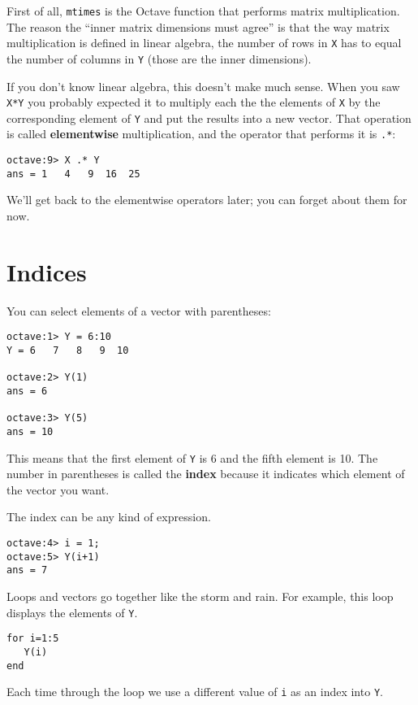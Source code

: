 First of all, {\tt mtimes} is the Octave function that performs
matrix multiplication. The reason the ``inner matrix dimensions
must agree'' is that the way matrix multiplication is defined in
linear algebra, the number of rows in {\tt X} has to equal the
number of columns in {\tt Y} (those are the inner dimensions).

If you don't know linear algebra, this doesn't make much sense.
When you saw {\tt X*Y} you probably expected it to multiply each
the the elements of {\tt X} by the corresponding element of
{\tt Y} and put the results into a new vector. That operation
is called {\bf elementwise} multiplication, and the operator that
performs it is {\tt .*}:

\begin{verbatim}
octave:9> X .* Y
ans = 1   4   9  16  25
\end{verbatim}

We'll get back to the elementwise operators later; you can
forget about them for now.




\section{Indices}

You can select elements of a vector with parentheses:

\begin{verbatim}
octave:1> Y = 6:10
Y = 6   7   8   9  10

octave:2> Y(1)
ans = 6

octave:3> Y(5)
ans = 10
\end{verbatim}

This means that the first element of {\tt Y} is 6 and the
fifth element is 10. The number in parentheses is called
the {\bf index} because it indicates which element of the
vector you want.

The index can be any kind of expression.

\begin{verbatim}
octave:4> i = 1;
octave:5> Y(i+1)
ans = 7
\end{verbatim}

Loops and vectors go together like the storm and rain.
For example, this loop displays the elements of {\tt Y}.

\begin{verbatim}
for i=1:5
   Y(i)
end
\end{verbatim}

Each time through the loop we use a different value of {\tt i}
as an index into {\tt Y}.

